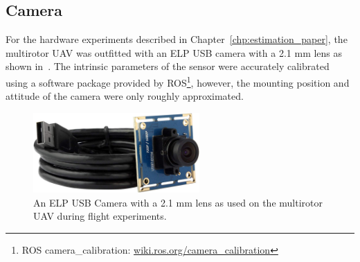 \subsection{Camera}
For the hardware experiments described in Chapter~\ref{chp:estimation_paper},
the multirotor UAV was outfitted with an ELP USB camera with a 2.1 mm lens as
shown in~. The intrinsic parameters of the sensor were
accurately calibrated using a software package provided by ROS\footnote{ROS
camera\_calibration: \href{wiki.ros.org/camera_calibration}{wiki.ros.org/camera\_calibration}},
however, the mounting position and attitude of the camera were only roughly
approximated.

\begin{figure}[h]
  \centering
  \includegraphics[width=2.5in]{figures/camera.jpg}
  \caption[ELP USB Camera with 2.1 $mm$ Lens]{An ELP USB Camera with a 2.1 mm
  lens as used on the multirotor UAV during flight experiments.}
%
  \label{fig:camera}
\end{figure}

